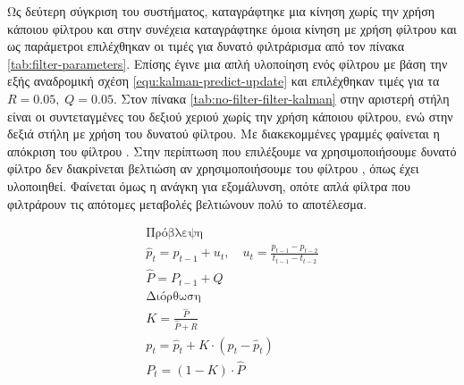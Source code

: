 Ως δεύτερη σύγκριση του συστήματος, καταγράφτηκε μια κίνηση χωρίς την χρήση κάποιου φίλτρου και στην συνέχεια καταγράφτηκε όμοια κίνηση με χρήση φίλτρου και ως παράμετροι επιλέχθηκαν οι τιμές για δυνατό φιλτράρισμα από τον πίνακα \ref{tab:filter-parameters}. Επίσης έγινε μια απλή υλοποίηση ενός φίλτρου  με βάση την εξής αναδρομική σχέση \ref{equ:kalman-predict-update} και επιλέχθηκαν τιμές για τα $R = 0.05,\; Q = 0.05$. Στον πίνακα \ref{tab:no-filter-filter-kalman} στην αριστερή στήλη είναι οι συντεταγμένες του δεξιού χεριού χωρίς την χρήση κάποιου φίλτρου, ενώ στην δεξιά στήλη με χρήση του δυνατού φίλτρου. Με διακεκομμένες γραμμές φαίνεται η απόκριση του φίλτρου . Στην περίπτωση που επιλέξουμε να χρησιμοποιήσουμε δυνατό φίλτρο δεν διακρίνεται βελτιώση αν χρησιμοποιήσουμε του φίλτρου , όπως έχει υλοποιηθεί. Φαίνεται όμως η ανάγκη για εξομάλυνση, οπότε απλά φίλτρα που φιλτράρουν τις απότομες μεταβολές βελτιώνουν πολύ το αποτέλεσμα.

\begin{equation}
    \begin{gathered}
        \text{Πρόβλεψη} \\
        \hat{p}_{t} = p_{t-1} + u_{t}, \quad u_{t} = \frac{p_{t-1} - p_{t-2}}{t_{t-1} - t_{t-2}} \\
        \hat{P} = P_{t-1} + Q \\[.5cm]
        \text{Διόρθωση} \\
        Κ = \frac{\hat{P}}{\hat{P} + R}\\
        p_{t} = \hat{p}_{t} + K \cdot (p_{t} - \hat{p}_{t}) \\
        P_{t} = (1 - K) \cdot \hat{P}
    \end{gathered}
    \label{equ:kalman-predict-update}
\end{equation}

